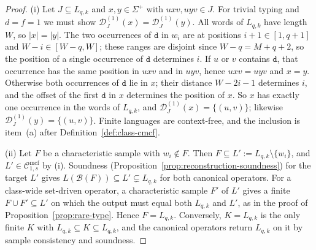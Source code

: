 \documentclass[11pt]{article}
\numberwithin{equation}{section}
\theoremstyle{plain}
\theoremstyle{definition}
\theoremstyle{remark}
\newcommand{\Cmcf}[2]{\mathcal{C}^{\mathrm{mcf}}_{#1,#2}}
\newcommand{\D}{\mathcal{D}}
\begin{document}
\begin{proof}
(i) Let $J\subseteq L_{q,k}$ and $x,y\in\Sigma^+$ with $uxv,uyv\in J$.  For
trivial typing and $d=f=1$ we must show $\D_J^{(1)}(x)=\D_J^{(1)}(y)$.  All
words of $L_{q,k}$ have length $W$, so $|x|=|y|$.  The two occurrences of
$\mathtt d$ in $w_i$ are at positions $i+1\in[1,q+1]$ and
$W-i\in[W-q,W]$; these ranges are disjoint since $W-q=M+q+2$, so the
position of a single occurrence of $\mathtt d$ determines $i$.  If $u$ or $v$
contains $\mathtt d$, that occurrence has the same position in $uxv$ and in
$uyv$, hence $uxv=uyv$ and $x=y$.  Otherwise both occurrences of
$\mathtt d$ lie in $x$; their distance $W-2i-1$ determines $i$, and the
offset of the first $\mathtt d$ in $x$ determines the position of $x$.  So
$x$ has exactly one occurrence in the words of $L_{q,k}$, and
$\D_J^{(1)}(x)=\{(u,v)\}$; likewise $\D_J^{(1)}(y)=\{(u,v)\}$.  Finite
languages are context-free, and the inclusion is item~(a) after
Definition~\ref{def:class-cmcf}.

(ii) Let $F$ be a characteristic sample with $w_i\notin F$.  Then
$F\subseteq L':=L_{q,k}\setminus\{w_i\}$, and $L'\in\Cmcf{1}{s}$ by (i).
Soundness (Proposition~\ref{prop:reconstruction-soundness}) for the target
$L'$ gives $L(\mathcal B(F))\subseteq L'\subsetneq L_{q,k}$ for both canonical
operators.  For a class-wide set-driven operator, a characteristic sample
$F'$ of $L'$ gives a finite $F\cup F'\subseteq L'$ on which the output must
equal both $L_{q,k}$ and $L'$, as in the proof of
Proposition~\ref{prop:rare-type}.  Hence $F=L_{q,k}$.  Conversely,
$K=L_{q,k}$ is the only finite $K$ with $L_{q,k}\subseteq K\subseteq L_{q,k}$,
and the canonical operators return $L_{q,k}$ on it by sample consistency and
soundness.


\end{proof}
\end{document}
